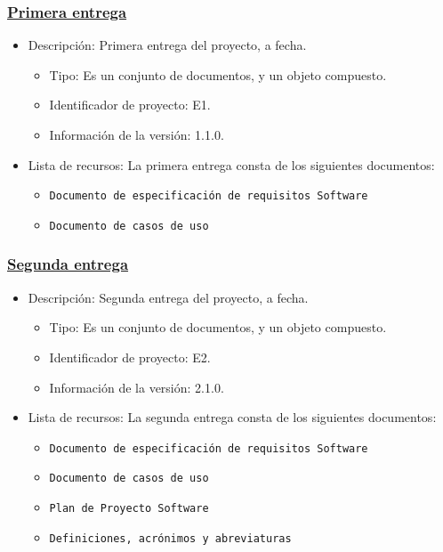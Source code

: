 \documentclass[spanish,a4paper,11pt, twoside]{report}	%
\begin{document}
			\subsubsection{\underline{Primera entrega}}
			\begin{itemize}	
				\item{Descripción:} Primera entrega del proyecto, a fecha.
					\begin{itemize}	
						\item{Tipo:} Es un conjunto de documentos, y un objeto compuesto. 
						\item{Identificador de proyecto:} E1.
						\item{Información de la versión:} 1.1.0.
					\end{itemize}	
				\item{Lista de recursos:} La primera entrega consta de los siguientes documentos:
					\begin{itemize}	
						\item \texttt{Documento de especificación de requisitos Software} 
						\item \texttt{Documento de casos de uso} 
					\end{itemize}
			\end{itemize}	

			\subsubsection{\underline{Segunda entrega}}
			\begin{itemize}	
				\item{Descripción:} Segunda entrega del proyecto, a fecha.
					\begin{itemize}	
						\item{Tipo:} Es un conjunto de documentos, y un objeto compuesto. 
						\item{Identificador de proyecto:} E2.
						\item{Información de la versión:} 2.1.0.
					\end{itemize}	
				\item{Lista de recursos:} La segunda entrega consta de los siguientes documentos:
					\begin{itemize}	
						\item \texttt{Documento de especificación de requisitos Software}
						\item \texttt{Documento de casos de uso}
						\item \texttt{Plan de Proyecto Software}
						\item \texttt{Definiciones, acrónimos y abreviaturas}
					\end{itemize}
			\end{itemize}
\end{document}
